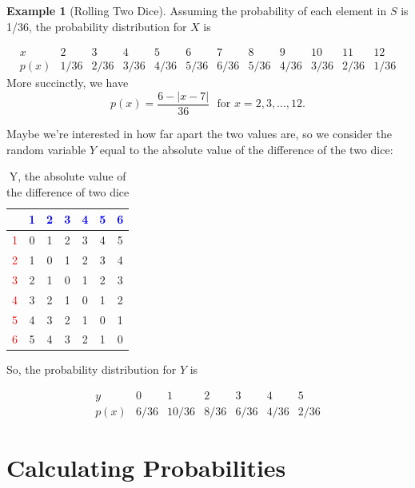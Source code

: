 \documentclass[
]{book}
\theoremstyle{definition}
\theoremstyle{definition}
\newtheorem{example}{Example}[chapter]
\theoremstyle{definition}
\theoremstyle{definition}
\theoremstyle{remark}
\begin{document}
\begin{example}[Rolling Two Dice]
Assuming the probability of each element in \(S\) is 1/36, the probability distribution for \(X\) is

\[
\begin{array}{c|c|c|c|c|c|c|c|c|c|c|c}
x & 2 & 3 & 4 & 5 & 6 & 7 & 8 & 9 & 10 & 11 & 12 \\ \hline
p(x) & 1/36 & 2/36 & 3/36 & 4/36 & 5/36 & 6/36 & 5/36 & 4/36 & 3/36 & 2/36 & 1/36 
\end{array}
\]
More succinctly, we have \[p(x) = \frac{6-|x-7|}{36} ~~~\text {for } x= 2, 3, \ldots, 12.\]

Maybe we're interested in how far apart the two values are, so we consider the random variable \(Y\) equal to the absolute value of the difference of the two dice:

\begin{table}[!h]
\centering\centering
\caption{\label{tab:unnamed-chunk-5}Y, the absolute value of the difference of two dice}
\centering
\begin{tabular}[t]{>{}l||>{}c|c|c|c|c|c}
\hline
\textcolor{blue}{ } & \textcolor{blue}{1} & \textcolor{blue}{2} & \textcolor{blue}{3} & \textcolor{blue}{4} & \textcolor{blue}{5} & \textcolor{blue}{6}\\
\hline
\textcolor{red}{1} & 0 & 1 & 2 & 3 & 4 & 5\\
\hline
\textcolor{red}{2} & 1 & 0 & 1 & 2 & 3 & 4\\
\hline
\textcolor{red}{3} & 2 & 1 & 0 & 1 & 2 & 3\\
\hline
\textcolor{red}{4} & 3 & 2 & 1 & 0 & 1 & 2\\
\hline
\textcolor{red}{5} & 4 & 3 & 2 & 1 & 0 & 1\\
\hline
\textcolor{red}{6} & 5 & 4 & 3 & 2 & 1 & 0\\
\hline
\end{tabular}
\end{table}

\end{example}

So, the probability distribution for \(Y\) is

\[
\begin{array}{c|c|c|c|c|c|c}
y & 0 & 1 & 2 & 3 & 4 & 5 \\ \hline
p(x) & 6/36 & 10/36 & 8/36 & 6/36 & 4/36 & 2/36 
\end{array}
\]

\section{Calculating Probabilities}\label{calculating-probabilities}
\end{document}

